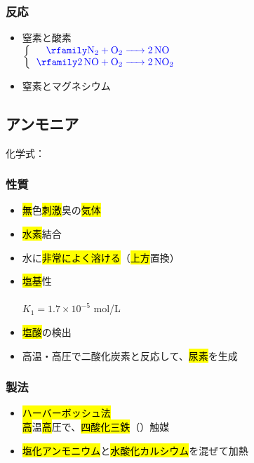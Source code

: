\subsubsection{反応}
\begin{itemize}
      \item 窒素と酸素\\
            $\left\{
                  \begin{tabular}{r}
                        \hce{N2 + O2 -> 2NO}\phantom{${}_{2}$} \\
                        \hce{2NO + O2 -> 2NO2}
                  \end{tabular}
                  \right.$
      \item 窒素とマグネシウム\\
\end{itemize}
\newpage
\subsection{アンモニア}
化学式：\hl{}
\subsubsection{性質}
\begin{itemize}
      \item \hl{無}色\hl{刺激}臭の\hl{気体}
      \item \hl{水素}結合
      \item 水に\hl{非常によく溶ける}（\hl{上方}置換）
      \item \hl{塩基}性\\
            \hl{} \\
            \hfill $K_{1}=1.7\times10^{-5}$ mol/L
      \item \hl{塩酸}の検出
      \item 高温・高圧で二酸化炭素と反応して、\hl{尿素}を生成
\end{itemize}
\subsubsection{製法}
\begin{itemize}
      \item \hl{ハーバーボッシュ法} \K\\
            \hl{高}温\hl{高}圧で、\hl{四酸化三鉄}（\hl{}）触媒\\
      \item \hl{塩化アンモニウム}と\hl{水酸化カルシウム}を混ぜて加熱\\
\end{itemize}
